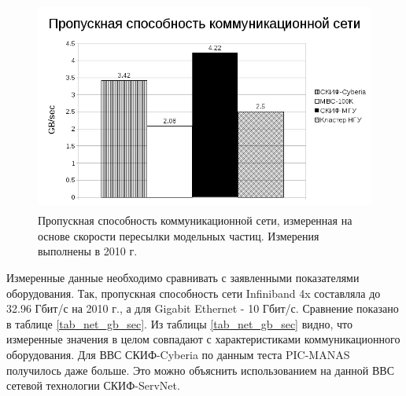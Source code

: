 \begin{figure}[htb]
	\begin{center}
		\includegraphics[height=7cm,keepaspectratio]{images/network_throughput_GB_sec.png}
	\end{center}
	\caption{Пропускная способность коммуникационной сети, измеренная на основе скорости пересылки модельных частиц. Измерения выполнены в 2010 г.}
	\label{plot_net_gb_sec}
\end{figure} 

Измеренные данные необходимо сравнивать с заявленными показателями оборудования. Так, пропускная способность сети Infiniband 4x составляла до 32.96 Гбит/с на 2010 г.,  а для Gigabit Ethernet - 10 Гбит/с. Сравнение показано в таблице  \ref{tab_net_gb_sec}. Из таблицы  \ref{tab_net_gb_sec} видно, что измеренные значения в целом совпадают с характеристиками коммуникационного оборудования. Для ВВС СКИФ-Cyberia по данным теста PIC-MANAS получилось даже больше. Это можно объяснить использованием на данной ВВС сетевой технологии СКИФ-ServNet. 

